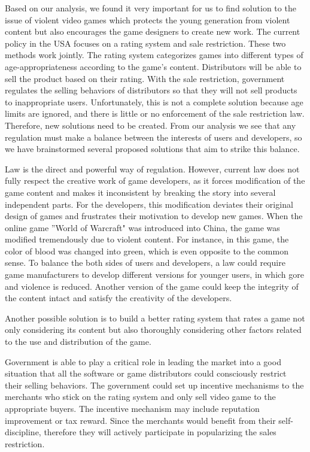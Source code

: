 \indent\indent Based on our analysis, we found it very important for us to find solution to the issue of violent video games which protects the young generation from violent content but also encourages the game designers to create new work. The current policy in the USA focuses on a rating system and sale restriction. These two methods work jointly. The rating system categorizes games into different types of age-appropriateness according to the game's content. Distributors will be able to sell the product based on their rating. With the sale restriction, government regulates the selling behaviors of distributors so that they will not sell products to inappropriate users. Unfortunately, this is not a complete solution because age limits are ignored, and there is little or no enforcement of the sale restriction law. Therefore, new solutions need to be created. From our analysis we see that any regulation must make a balance between the interests of users and developers, so we have brainstormed several proposed solutions that aim to strike this balance. 

Law is the direct and powerful way of regulation. However, current law  does not fully respect the creative work of game developers, as it forces modification of the game content and makes it inconsistent by breaking the story into several independent parts. For the developers, this modification deviates their original design of games and frustrates their motivation to develop new games. When the online game ''World of Warcraft" was introduced into China, the game was modified tremendously due to violent content. For instance, in this game, the color of blood was changed into green, which is even opposite to the common sense. To balance the both sides of users and developers, a law could require game manufacturers to develop different versions for younger users, in which gore and violence is reduced. Another version of the game could keep the integrity of the content intact and satisfy the creativity of the developers. 

Another possible solution is to build a better rating system that rates a game not only considering its content but also thoroughly considering other factors related to the use and distribution of the game. 

Government is able to play a critical role in leading the market into a good situation that all the software or game distributors could consciously restrict their selling behaviors. The government could set up incentive mechanisms to the merchants who stick on the rating system and only sell video game to the appropriate buyers. The incentive mechanism may include reputation improvement or tax reward. Since the merchants would benefit from their self-discipline, therefore they will actively participate in popularizing the sales restriction.

